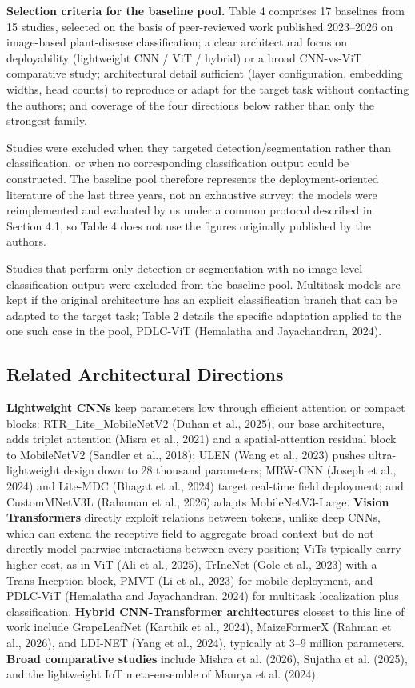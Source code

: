 \textbf{Selection criteria for the baseline pool.} Table 4 comprises 17 baselines from 15 studies, selected on the basis of peer-reviewed work published 2023--2026 on image-based plant-disease classification; a clear architectural focus on deployability (lightweight CNN / ViT / hybrid) or a broad CNN-vs-ViT comparative study; architectural detail sufficient (layer configuration, embedding widths, head counts) to reproduce or adapt for the target task without contacting the authors; and coverage of the four directions below rather than only the strongest family.

Studies were excluded when they targeted detection/segmentation rather than classification, or when no corresponding classification output could be constructed. The baseline pool therefore represents the deployment-oriented literature of the last three years, not an exhaustive survey; the models were reimplemented and evaluated by us under a common protocol described in Section 4.1, so Table 4 does not use the figures originally published by the authors.

Studies that perform only detection or segmentation with no image-level classification output were excluded from the baseline pool. Multitask models are kept if the original architecture has an explicit classification branch that can be adapted to the target task; Table 2 details the specific adaptation applied to the one such case in the pool, PDLC-ViT (Hemalatha and Jayachandran, 2024).

\subsection{Related Architectural Directions}\label{related-architectural-directions}

\textbf{Lightweight CNNs} keep parameters low through efficient attention or compact blocks: RTR\_Lite\_MobileNetV2 (Duhan et al., 2025), our base architecture, adds triplet attention (Misra et al., 2021) and a spatial-attention residual block to MobileNetV2 (Sandler et al., 2018); ULEN (Wang et al., 2023) pushes ultra-lightweight design down to 28 thousand parameters; MRW-CNN (Joseph et al., 2024) and Lite-MDC (Bhagat et al., 2024) target real-time field deployment; and CustomMNetV3L (Rahaman et al., 2026) adapts MobileNetV3-Large. \textbf{Vision Transformers} directly exploit relations between tokens, unlike deep CNNs, which can extend the receptive field to aggregate broad context but do not directly model pairwise interactions between every position; ViTs typically carry higher cost, as in ViT (Ali et al., 2025), TrIncNet (Gole et al., 2023) with a Trans-Inception block, PMVT (Li et al., 2023) for mobile deployment, and PDLC-ViT (Hemalatha and Jayachandran, 2024) for multitask localization plus classification. \textbf{Hybrid CNN-Transformer architectures} closest to this line of work include GrapeLeafNet (Karthik et al., 2024), MaizeFormerX (Rahman et al., 2026), and LDI-NET (Yang et al., 2024), typically at 3--9 million parameters. \textbf{Broad comparative studies} include Mishra et al. (2026), Sujatha et al. (2025), and the lightweight IoT meta-ensemble of Maurya et al. (2024).

